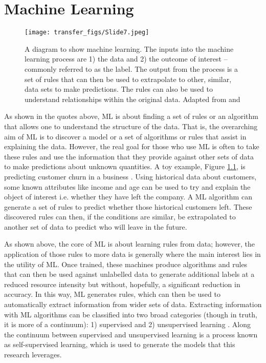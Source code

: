 
\chapter{Machine Learning}

\begin{figure}
  \texttt{[image: transfer\_figs/Slide7.jpeg]}
  \caption[Machine learning diagram.]{A diagram to show machine learning. The inputs into the machine learning process are 1) the data and 2) the outcome of interest – commonly referred to as the label. The output from the process is a set of rules that can then be used to extrapolate to other, similar, data sets to make predictions. The rules can also be used to understand relationships within the original data.  Adapted from  \textcite{chollet_allaire_2018} and \textcite{provost2013data} }
  \label{fig:ML}
\end{figure}


 \parencite{spiegelhalter2019art}

 \parencite{chollet_allaire_2018}


As shown in the quotes above, ML is about finding a set of rules or an algorithm that allows one to understand the structure of the data. That is, the overarching aim of ML is to discover a model or a set of algorithms or rules that assist in explaining the data. However, the real goal for those who use ML is often to take these rules and use the information that they provide against other sets of data to make predictions about unknown quantities. A toy example, Figure \ref{fig:ML},  is predicting customer churn in a business \parencite{provost2013data}. Using historical data about customers, some known attributes like income and age can be used to try and explain the object of interest i.e. whether they have left the company. A ML algorithm can generate a set of rules to predict whether those historical customers left. These discovered rules can then, if the conditions are similar, be extrapolated to another set of data to predict who will leave in the future.

As shown above, the core of ML is about learning rules from data; however, the application of those rules to more data is generally where the main interest lies in the utility of ML. Once trained, these machines produce algorithms and rules that can then be used against unlabelled data to generate additional labels at a reduced resource intensity but without, hopefully, a significant reduction in accuracy. In this way, ML generates rules, which can then be used to automatically extract information from wider sets of data. Extracting information with ML algorithms can be classified into two broad categories (though in truth, it is more of a continuum): 1) supervised and 2) unsupervised learning  \parencite{chollet_allaire_2018}. Along the continuum between supervised and unsupervised learning is a process known as self-supervised learning, which is used to generate the models that this research leverages. 

